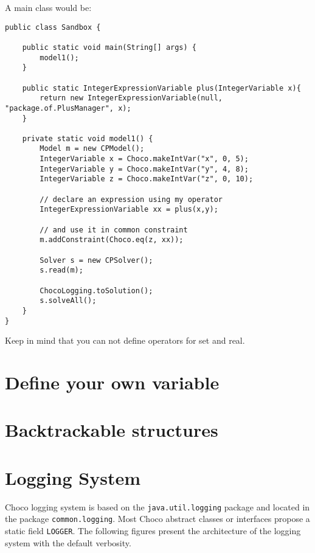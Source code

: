 A main class would be:
\begin{lstlisting}
public class Sandbox {

    public static void main(String[] args) {
        model1();
    }

    public static IntegerExpressionVariable plus(IntegerVariable x){
        return new IntegerExpressionVariable(null, "package.of.PlusManager", x);
    }

    private static void model1() {
        Model m = new CPModel();
        IntegerVariable x = Choco.makeIntVar("x", 0, 5);
        IntegerVariable y = Choco.makeIntVar("y", 4, 8);
        IntegerVariable z = Choco.makeIntVar("z", 0, 10);
	
        // declare an expression using my operator
        IntegerExpressionVariable xx = plus(x,y);

        // and use it in common constraint
        m.addConstraint(Choco.eq(z, xx));

        Solver s = new CPSolver();
        s.read(m);

        ChocoLogging.toSolution();
        s.solveAll();
    }
}
\end{lstlisting}

Keep in mind that you can not define operators for set and real. 


\section{Define your own variable}\label{advanced:defineyourownvariable}\hypertarget{advanced:defineyourownvariable}{}
\section{Backtrackable structures}\label{advanced:backtrackablestructures}\hypertarget{advanced:backtrackablestructures}{}

\section{Logging System}\label{advanced:loggingsystem}\hypertarget{advanced:loggingsystem}{}

Choco logging system is based on the \texttt{java.util.logging} package and located in the package \texttt{common.logging}.
Most Choco abstract classes or interfaces propose a static field \texttt{LOGGER}.
The following figures present the architecture of the logging system with the default verbosity.

